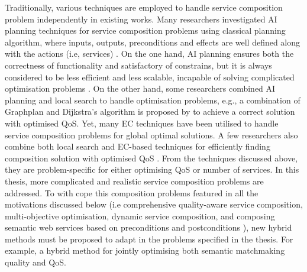 Traditionally, various techniques are employed to handle service composition problem independently in existing works. Many researchers investigated AI planning techniques for service composition problems using classical planning algorithm, where inputs, outputs, preconditions and effects are well defined along with the actions (i.e, services) \cite{markou2015non,peer2005web}. On the one hand, AI planning ensures both the correctness of functionality and satisfactory of constrains, but it is always considered to be less efficient and less scalable, incapable of solving complicated optimisation problems \cite{parejo2008qos}. On the other hand, some researchers combined AI planning and local search to handle optimisation problems, e.g., a combination of Graphplan \cite{blum1997fast} and Dijkstra’s algorithm is proposed by \cite{feng2013dynamic} to achieve a correct solution with optimised QoS. Yet, many EC techniques have been utilised to handle service composition problems for global optimal solutions. A few researchers also combine both local search and EC-based techniques for efficiently finding composition solution with optimised QoS \cite{parejo2008qos}. From the techniques discussed above, they are problem-specific for either optimising QoS or number of services. In this thesis, more complicated and realistic service composition problems are addressed. To with cope this composition problems featured in all the motivations discussed below (i.e comprehensive quality-aware service composition, multi-objective optimisation, dynamic service composition, and composing semantic web services based on preconditions and postconditions ), new hybrid methods must be proposed to adapt in the problems specified in the thesis. For example, a hybrid method for jointly optimising both semantic matchmaking quality and QoS. 

